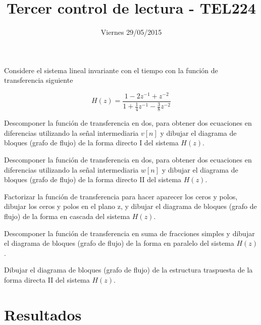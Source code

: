 \documentclass[addpoints]{exam}
\begin{document}
\headrule

\title{Tercer control de lectura - TEL224}
\date{Viernes 29/05/2015}
\maketitle

\vspace{0.1in}
\vspace{0.1in}

Considere el sistema lineal invariante con el tiempo con la función de transferencia siguiente

$$H(z) = \frac{1 - 2 z^{-1} + z^{-2}}{1 + \frac{1}{4} z^{-1} -\frac{3}{8} z^{-2}}$$

\begin{questions}

\question[20]

Descomponer la función de transferencia en dos, para obtener dos ecuaciones en diferencias utilizando la señal intermediaria \(v[n]\) y dibujar el diagrama de bloques (grafo de flujo) de la forma directo I del sistema \(H(z)\).

\question[20]

Descomponer la función de transferencia en dos, para obtener dos ecuaciones en diferencias utilizando la señal intermediaria \(w[n]\) y dibujar el diagrama de bloques (grafo de flujo) de la forma directo II del sistema \(H(z)\).

\newpage
\question[20]

Factorizar la función de transferencia para hacer aparecer los ceros y polos, dibujar los ceros y polos en el plano z, y dibujar el diagrama de bloques (grafo de flujo) de la forma en cascada del sistema \(H(z)\).

\question[20]

Descomponer la función de transferencia en suma de fracciones simples y dibujar el diagrama de bloques (grafo de flujo) de la forma en paralelo del sistema \(H(z)\).

\newpage
\question[20]

Dibujar el diagrama de bloques (grafo de flujo) de la estructura traspuesta de la forma directa II del sistema \(H(z)\).


\end{questions}

\section*{Resultados}

\begin{center}
\gradetable[v][questions]
\end{center}

\footrule
{}
\end{document}
